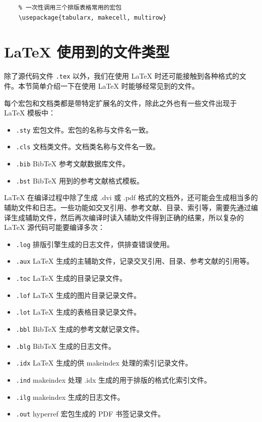 \begin{lstlisting}
    % 一次性调用三个排版表格常用的宏包
    \usepackage{tabularx, makecell, multirow}
\end{lstlisting}

\section{\LaTeX{} 使用到的文件类型}\label{sec:latexfiletypes}

除了源代码文件 \lstinline{.tex} 以外，我们在使用 \LaTeX{} 时还可能接触到各种格式的文件。本节简单介绍一下在使用 \LaTeX{} 时能够经常见到的文件。

每个宏包和文档类都是带特定扩展名的文件，除此之外也有一些文件出现于 \LaTeX{} 模板中：

\begin{itemize}
    \item \lstinline{.sty} 宏包文件。宏包的名称与文件名一致。
    \item \lstinline{.cls} 文档类文件。文档类名称与文件名一致。
    \item \lstinline{.bib} BibTeX 参考文献数据库文件。
    \item \lstinline{.bst} BibTeX 用到的参考文献格式模板。
\end{itemize}

\LaTeX{} 在编译过程中除了生成 .dvi 或 .pdf 格式的文档外，还可能会生成相当多的辅助文件和日志。一些功能如交叉引用、参考文献、目录、索引等，需要先通过编译生成辅助文件，然后再次编译时读入辅助文件得到正确的结果，所以复杂的 \LaTeX{} 源代码可能要编译多次：

\begin{itemize}
    \item \lstinline{.log} 排版引擎生成的日志文件，供排查错误使用。
    \item \lstinline{.aux} \LaTeX{} 生成的主辅助文件，记录交叉引用、目录、参考文献的引用等。
    \item \lstinline{.toc} \LaTeX{} 生成的目录记录文件。
    \item \lstinline{.lof} \LaTeX{} 生成的图片目录记录文件。
    \item \lstinline{.lot} \LaTeX{} 生成的表格目录记录文件。
    \item \lstinline{.bbl} BibTeX 生成的参考文献记录文件。
    \item \lstinline{.blg} BibTeX 生成的日志文件。
    \item \lstinline{.idx} \LaTeX{} 生成的供 makeindex 处理的索引记录文件。
    \item \lstinline{.ind} makeindex 处理 .idx 生成的用于排版的格式化索引文件。
    \item \lstinline{.ilg} makeindex 生成的日志文件。
    \item \lstinline{.out} hyperref 宏包生成的 PDF 书签记录文件。
\end{itemize}

